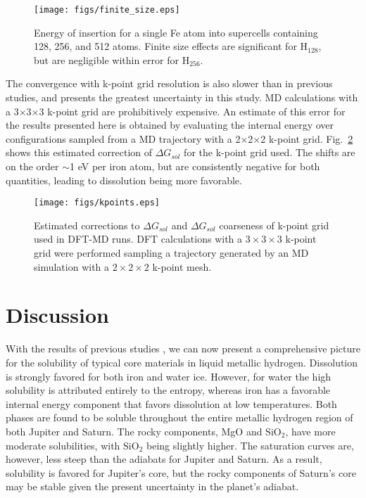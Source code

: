  \begin{figure}[H] %
   \centering
   \texttt{[image: figs/finite\_size.eps]} 
\caption{Energy of insertion for a single Fe atom into supercells containing
128, 256, and 512 atoms. Finite size effects are significant
for $\mathrm{H}_{128}$, but are negligible within error for $\mathrm{H}_{256}$. \label{fig:finite_size}}
\end{figure}

The convergence with k-point grid resolution is also slower
than in previous studies, and presents the greatest uncertainty in this study.
MD calculations with a 3$\times$3$\times$3 k-point grid are prohibitively expensive. An
estimate of this error for the results presented here is obtained by
evaluating the internal energy over configurations sampled from a MD
trajectory with a 2$\times$2$\times$2 k-point grid. Fig.~\ref{fig:kpoints} shows this
estimated correction of $\Delta G_{sol}$ for the k-point grid used. 
The shifts are on the order $\sim$1 eV per iron atom, but are
consistently negative for both quantities, leading to dissolution being more favorable. 


 \begin{figure}[!h] %
   \centering
   \texttt{[image: figs/kpoints.eps]} 
\caption{Estimated corrections to $\Delta G_{sol}$ and $\Delta G_{sol}$
coarseness of k-point grid used in DFT-MD runs. DFT calculations with a $3\times
3\times 3$ k-point grid were performed sampling a trajectory generated by an MD
simulation with a $2\times2\times 2$ k-point mesh. \label{fig:kpoints}}
\end{figure}

\section{Discussion}

With the results of previous studies
\citep{wilson12a,wilson12b,gonzalez13}, we can now present a comprehensive
picture for the solubility of typical core materials in liquid
metallic hydrogen.
Dissolution is strongly favored for both iron and water
ice. However, for water the high solubility is attributed entirely to the
entropy, whereas iron has a favorable internal energy component that favors
dissolution at low temperatures.
Both phases are found to be soluble throughout the entire metallic
hydrogen region of both Jupiter and Saturn. The rocky components, MgO and
$\mathrm{SiO}_2$, have more moderate solubilities, with $\mathrm{SiO}_2$ being slightly higher. The saturation
curves are, however, less steep than the adiabats for Jupiter and Saturn. As a
result, solubility is favored for Jupiter's core, but the rocky components of
Saturn's core may be stable given the present uncertainty in the planet's
adiabat.

